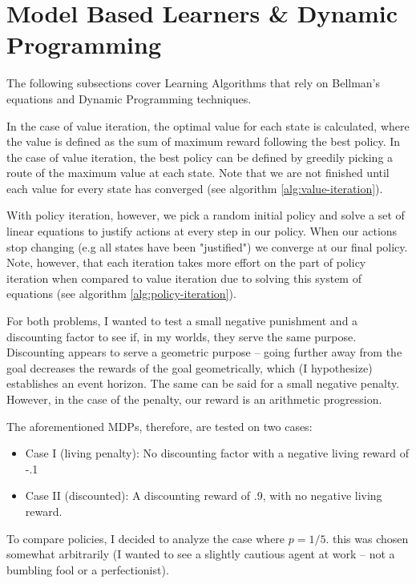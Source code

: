 \documentclass[letter]{article}
\begin{document}
\section{Model Based Learners \& Dynamic Programming}
The following subsections cover Learning Algorithms that rely on Bellman's equations and Dynamic Programming techniques.

In the case of value iteration, the optimal value for each state is calculated, where the value is defined as the sum of maximum reward following the best policy. In the case of value iteration, the best policy can be defined by greedily picking a route of the maximum value at each state. Note that we are not finished until each value for every state has converged (see algorithm \ref{alg:value-iteration}).

With policy iteration, however, we pick a random initial policy and solve a set of linear equations to justify actions at every step in our policy. When our actions stop changing (e.g all states have been "justified") we converge at our final policy. Note, however, that each iteration takes more effort on the part of policy iteration when compared to value iteration due to solving this system of equations (see algorithm \ref{alg:policy-iteration}). 

For both problems, I wanted to test a small negative punishment and a discounting factor to see if, in my worlds, they serve the same purpose. Discounting appears to serve a geometric purpose -- going further away from the goal decreases the rewards of the goal geometrically, which (I hypothesize) establishes an event horizon. The same can be said for a small negative penalty. However, in the case of the penalty, our reward is an arithmetic progression. 

The aforementioned MDPs, therefore, are tested on two cases:

\begin{itemize}
    \item Case I (living penalty): No discounting factor with a negative living reward of -.1
    \item Case II (discounted): A discounting reward of .9, with no negative living reward.
\end{itemize}

To compare policies, I decided to analyze the case where $p=1/5$. this was chosen somewhat arbitrarily (I wanted to see a slightly cautious agent at work -- not a bumbling fool or a perfectionist).
\end{document}
